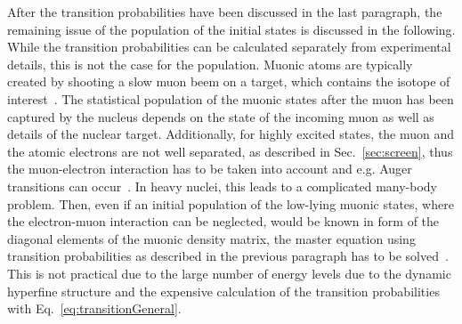 After the transition probabilities have been discussed in the last paragraph, the remaining issue of the population of the initial states is discussed in the following.
While the transition probabilities can be calculated separately from experimental details, this is not the case for the population. Muonic atoms are typically created by shooting a slow muon beem on a target, which contains the isotope of interest~\cite{wu1969,Devons1995,BorieRinker1982}. The statistical population of the muonic states after the muon has been captured by the nucleus depends on the state of the incoming muon as well as details of the nuclear target. Additionally, for highly excited states, the muon and the atomic electrons are not well separated, as described in Sec.~\ref{sec:screen}, thus the muon-electron interaction has to be taken into account and e.g. Auger transitions can occur~\cite{pisano1982}. In heavy nuclei, this leads to a complicated many-body problem. Then, even if an initial population of the low-lying muonic states, where the electron-muon interaction can be neglected, would be known in form of the diagonal elements of the muonic density matrix, the master equation using transition probabilities as described in the previous paragraph has to be solved~\cite{pisano1982}. This is not practical due to the large number of energy levels due to the dynamic hyperfine structure and the expensive calculation of the transition probabilities with Eq.~\eqref{eq:transitionGeneral}.

